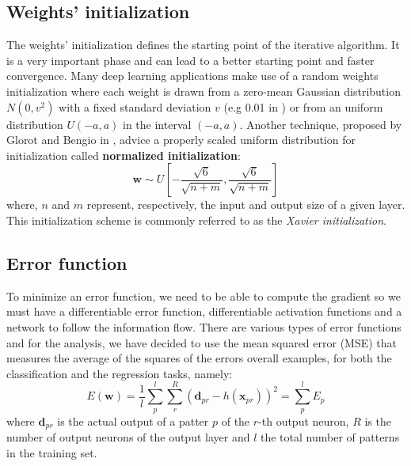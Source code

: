 \documentclass[11pt]{article}
\begin{document}
\subsection{Weights' initialization}
\label{sec:w_init}
The weights' initialization defines the starting point of the iterative algorithm. It is a very important phase and can lead to a better starting point and faster convergence. Many deep learning applications make use of a random weights initialization where each weight is drawn from a zero-mean Gaussian distribution $N(0,v^2)$ with a fixed standard deviation $v$ (e.g 0.01 in \cite{Krizhevsky_imagenetclassification}) or from an uniform distribution $U(-a,a)$ in the interval $(-a, a)$. Another technique, proposed by Glorot and Bengio in \cite{Glorot10understandingthe}, advice a properly scaled uniform distribution for initialization called \textbf{normalized initialization}:
$$ \mathbf{w} \sim U\left[-\frac{\sqrt{6}}{\sqrt{n + m}}, \frac{\sqrt{6}}{\sqrt{n + m}}\right]$$ 
where, $n$ and $m$ represent, respectively, the input and output size of a given layer. This initialization scheme is commonly referred to as the \textit{Xavier initialization}.

\subsection{Error function}
\label{sec:error_f}
To minimize an error function, we need to be able to compute the gradient so we must have a differentiable error function, differentiable activation functions and a network to follow the information flow. There are various types of error functions and for the analysis, we have decided to use the mean squared error (MSE) that measures the average of the squares of the errors overall examples, for both the classification and the regression tasks, namely:
\begin{equation}
\label{eq:error_function}
E(\mathbf{w})= \frac{1}{l} \sum_{p}^l \sum_{r}^R (\mathbf{d}_{pr}-h(\mathbf{x}_{pr}))^2  =   \sum_{p}^l E_p
\end{equation}
where $\mathbf{d}_{pr}$ is the actual output of a patter $p$ of the $r$-th output neuron, $R$ is the number of output neurons of the output layer and $l$ the total number of patterns in the training set.
\end{document}
